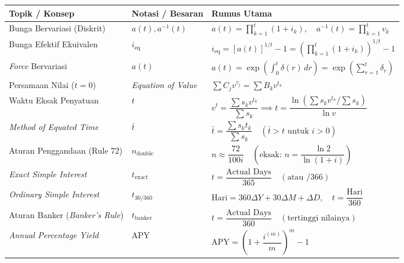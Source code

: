 \documentclass[11pt,a4paper]{article}
\begin{document}
\begin{center}
\small
\renewcommand{\arraystretch}{1.45}
\begin{tabular}{lll}
\toprule
\textbf{Topik / Konsep} & \textbf{Notasi / Besaran} & \textbf{Rumus Utama} \\
\midrule
Bunga Bervariasi (Diskrit) & $a(t), a^{-1}(t)$ & $a(t) = \prod_{k=1}^t (1 + i_k), \quad a^{-1}(t) = \prod_{k=1}^t v_k$ \\
Bunga Efektif Ekuivalen & $i_{\text{eq}}$ & $i_{\text{eq}} = [a(t)]^{1/t} - 1 = \left(\prod_{k=1}^t (1+i_k)\right)^{1/t} - 1$ \\
\textit{Force} Bervariasi & $a(t)$ & $a(t) = \exp\left(\int_0^t \delta(r)\,dr\right) = \exp\left(\sum_{r=1}^t \delta_r\right)$ \\
Persamaan Nilai ($t=0$) & \textit{Equation of Value} & $\sum C_j v^{\tau_j} = \sum B_k v^{t_k}$ \\
Waktu Eksak Penyatuan & $t$ & $v^t = \dfrac{\sum s_k v^{t_k}}{\sum s_k} \implies t = \dfrac{\ln\left(\sum s_k v^{t_k} / \sum s_k\right)}{\ln v}$ \\
\textit{Method of Equated Time} & $\bar{t}$ & $\bar{t} = \dfrac{\sum s_k t_k}{\sum s_k} \quad (\bar{t} > t \text{ untuk } i > 0)$ \\
Aturan Penggandaan (Rule 72) & $n_{\text{double}}$ & $n \approx \dfrac{72}{100i} \quad \left(\text{eksak: } n = \dfrac{\ln 2}{\ln(1+i)}\right)$ \\
\textit{Exact Simple Interest} & $t_{\text{exact}}$ & $t = \dfrac{\text{Actual Days}}{365} \quad (\text{atau } /366)$ \\
\textit{Ordinary Simple Interest} & $t_{30/360}$ & $\text{Hari} = 360\Delta Y + 30\Delta M + \Delta D, \quad t = \dfrac{\text{Hari}}{360}$ \\
Aturan Banker (\textit{Banker's Rule}) & $t_{\text{banker}}$ & $t = \dfrac{\text{Actual Days}}{360} \quad (\text{tertinggi nilainya})$ \\
\textit{Annual Percentage Yield} & APY & $\text{APY} = \left(1 + \dfrac{i^{(m)}}{m}\right)^m - 1$ \\
\bottomrule
\end{tabular}
\end{center}
\end{document}
